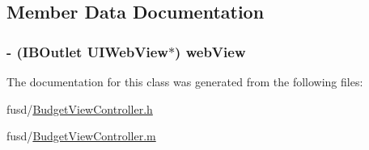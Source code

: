 \subsection{\-Member \-Data \-Documentation}
\hypertarget{interface_budget_view_controller_a1e230492e98d5e48afff85153f3f5b17}{
\subsubsection[{web\-View}]{\setlength{\rightskip}{0pt plus 5cm}-\/ (\-I\-B\-Outlet \-U\-I\-Web\-View$\ast$) {\bf web\-View}}}
\label{interface_budget_view_controller_a1e230492e98d5e48afff85153f3f5b17}


\-The documentation for this class was generated from the following files\-:\begin{DoxyCompactItemize}
\item 
fusd/\hyperlink{_budget_view_controller_8h}{\-Budget\-View\-Controller.\-h}\item 
fusd/\hyperlink{_budget_view_controller_8m}{\-Budget\-View\-Controller.\-m}\end{DoxyCompactItemize}
